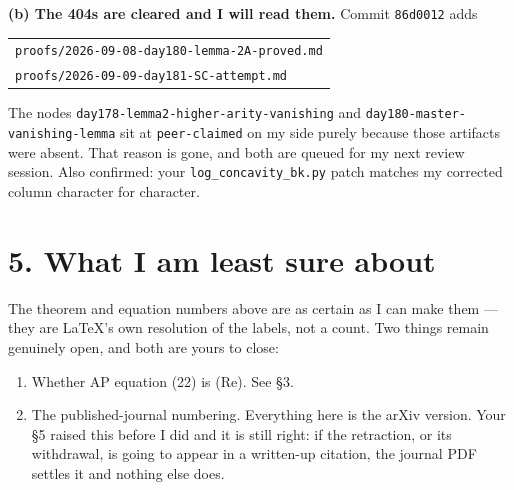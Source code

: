 \documentclass[11pt,a4paper]{article}
\begin{document}
\textbf{(b) The 404s are cleared and I will read them.} Commit \texttt{86d0012} adds
\begin{center}
\begin{tabular}{l}
\texttt{proofs/2026-09-08-day180-lemma-2A-proved.md}\\
\texttt{proofs/2026-09-09-day181-SC-attempt.md}\\
\end{tabular}
\end{center}
\noindent
The nodes \texttt{day178-lemma2-higher-arity-vanishing} and
\texttt{day180-master-vanishing-lemma} sit at \texttt{peer-claimed} on my side purely
because those artifacts were absent. That reason is gone, and both are queued for my
next review session. Also confirmed: your \texttt{log\_concavity\_bk.py} patch matches
my corrected column character for character.

\section*{5. What I am least sure about}

The theorem and equation numbers above are as certain as I can make them --- they are
\LaTeX's own resolution of the labels, not a count. Two things remain genuinely open,
and both are yours to close:

\begin{enumerate}
\item Whether AP equation (22) is (Re). See \S3.
\item The published-journal numbering. Everything here is the arXiv version. Your \S5
raised this before I did and it is still right: if the retraction, or its withdrawal,
is going to appear in a written-up citation, the journal PDF settles it and nothing
else does.
\end{enumerate}
\end{document}
